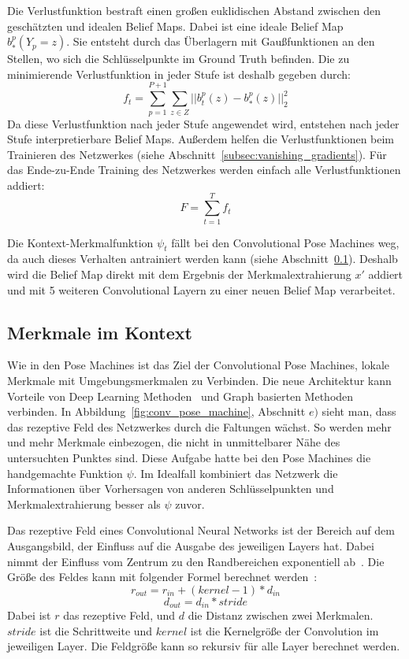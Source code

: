 \documentclass[journal, a4paper]{IEEEtran}
\begin{document}
        Die Verlustfunktion bestraft einen großen euklidischen Abstand zwischen den geschätzten und idealen Belief Maps. Dabei ist eine ideale Belief Map $b_{*}^{p}(Y_p = z)$. Sie entsteht durch das Überlagern mit Gaußfunktionen an den Stellen, wo sich die Schlüsselpunkte im Ground Truth befinden. %
        Die zu minimierende Verlustfunktion in jeder Stufe ist deshalb gegeben durch:
        \[ f_t = \sum_{p=1}^{P+1} \sum_{z \in Z} ||b_{t}^{p}(z) - b_{*}^{p}(z) ||_{2}^{2}\]
        Da diese Verlustfunktion nach jeder Stufe angewendet wird, entstehen nach jeder Stufe interpretierbare Belief Maps. Außerdem helfen die Verlustfunktionen beim Trainieren des Netzwerkes (siehe Abschnitt~\ref{subsec:vanishing_gradients}). Für das Ende-zu-Ende Training des Netzwerkes werden einfach alle Verlustfunktionen addiert:
        \[ F = \sum_{t=1}^{T} f_t \]


        Die Kontext-Merkmalfunktion $\psi_t$ fällt bei den Convolutional Pose Machines weg, da auch dieses Verhalten antrainiert werden kann (siehe Abschnitt~\ref{subsec:kontext}). Deshalb wird die Belief Map direkt mit dem Ergebnis der Merkmalextrahierung $x'$ addiert und mit 5 weiteren Convolutional Layern zu einer neuen Belief Map verarbeitet. 

\subsection{Merkmale im Kontext}\label{subsec:kontext}
        Wie in den Pose Machines ist das Ziel der Convolutional Pose Machines, lokale Merkmale mit Umgebungsmerkmalen zu Verbinden. Die neue Architektur kann Vorteile von Deep Learning Methoden~\cite{toshev2014deeppose} und Graph basierten Methoden~\cite{andriluka2009pictorial,LanWM11} verbinden. %
        In Abbildung~\ref{fig:conv_pose_machine}, Abschnitt $e)$ sieht man, dass das rezeptive Feld des Netzwerkes durch die Faltungen wächst. So werden mehr und mehr Merkmale einbezogen, die nicht in unmittelbarer Nähe des untersuchten Punktes sind. Diese Aufgabe hatte bei den Pose Machines die handgemachte Funktion $\psi$. Im Idealfall kombiniert das Netzwerk die Informationen über Vorhersagen von anderen Schlüsselpunkten und Merkmalextrahierung besser als $\psi$ zuvor.

        Das rezeptive Feld eines Convolutional Neural Networks ist der Bereich auf dem Ausgangsbild, der Einfluss auf die Ausgabe des jeweiligen Layers hat. Dabei nimmt der Einfluss vom Zentrum zu den Randbereichen exponentiell ab~\cite{dumoulin2016guide}. 
        Die Größe des Feldes kann mit folgender Formel berechnet werden~\cite{dumoulin2016guide}:
        \[ r_{out} = r_{in} + (kernel-1) * d_{in}\]
        \[ d_{out} = d_{in} * stride\]
        Dabei ist $r$ das rezeptive Feld, und $d$ die Distanz zwischen zwei Merkmalen. $stride$ ist die Schrittweite und $kernel$ ist die Kernelgröße der Convolution im jeweiligen Layer. Die Feldgröße kann so rekursiv für alle Layer berechnet werden.
        
\end{document}
